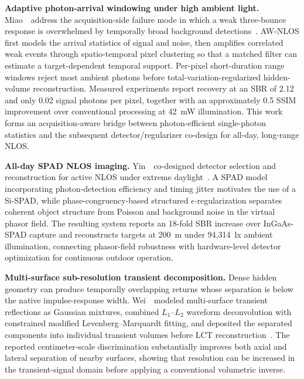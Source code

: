 \noindent \textbf{Adaptive photon-arrival windowing under high ambient light.}
Miao~\etal~address the acquisition-side failure mode in which a weak three-bounce response is overwhelmed by temporally broad background detections~\cite{miaoAdaptiveWindowingNLOS2025}. AW-NLOS first models the arrival statistics of signal and noise, then amplifies correlated weak events through spatio-temporal pixel clustering so that a matched filter can estimate a target-dependent temporal support. Per-pixel short-duration range windows reject most ambient photons before total-variation-regularized hidden-volume reconstruction. Measured experiments report recovery at an SBR of 2.12 and only 0.02 signal photons per pixel, together with an approximately 0.5 SSIM improvement over conventional processing at 42~mW illumination. This work forms an acquisition-aware bridge between photon-efficient single-photon statistics and the subsequent detector/regularizer co-design for all-day, long-range NLOS.

\vspace{0.8mm}
\noindent \textbf{All-day SPAD NLOS imaging.}
Yin~\etal~co-designed detector selection and reconstruction for active NLOS under extreme daylight~\cite{yinAllDayNLOS2026}. A SPAD model incorporating photon-detection efficiency and timing jitter motivates the use of a Si-SPAD, while phase-congruency-based structured $\epsilon$-regularization separates coherent object structure from Poisson and background noise in the virtual phasor field. The resulting system reports an 18-fold SBR increase over InGaAs-SPAD capture and reconstructs targets at 200~m under 94,314~lx ambient illumination, connecting phasor-field robustness with hardware-level detector optimization for continuous outdoor operation.

\vspace{0.8mm}
\noindent \textbf{Multi-surface sub-resolution transient decomposition.}
Dense hidden geometry can produce temporally overlapping returns whose separation is below the native impulse-response width. Wei~\etal~modeled multi-surface transient reflections as Gaussian mixtures, combined $L_1$--$L_2$ waveform deconvolution with constrained modified Levenberg--Marquardt fitting, and deposited the separated components into individual transient volumes before LCT reconstruction~\cite{weiMultiSurfaceNLOS2025}. The reported centimeter-scale discrimination substantially improves both axial and lateral separation of nearby surfaces, showing that resolution can be increased in the transient-signal domain before applying a conventional volumetric inverse.

